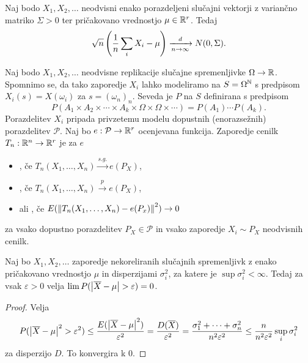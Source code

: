 \begin{izrek}
  Naj bodo $X_1, X_2, \ldots$ neodvisni enako porazdeljeni slučajni vektorji z
  variančno matriko $\Sigma > 0$ ter pričakovano vrednostjo $\mu \in \mathbb{R}^r$.
  Tedaj
  \[
	\sqrt{n} \left( \frac{1}{n} \sum_i X_i - \mu \right)
	\xrightarrow[n \to \infty]{d}
	N(0, \Sigma).
  \]
\end{izrek}


Naj bodo $X_1, X_2, \ldots$ neodvisne replikacije slučajne spremenljivke $\Omega
\to \mathbb{R}$.
Spomnimo se, da tako zaporedje $X_i$ lahko modeliramo na $S = \Omega^{\mathbb{N}}$ s
predpisom $X_i(s) = X(\omega_i)$ za $s = (\omega_n)_n$.
Seveda je $P$ na $S$ definirana s predpisom
\[
  P(A_1 \times A_2 \times \cdots \times A_k \times \Omega \times \Omega \times
  \cdots)
  = P(A_1) \cdots P(A_k).
\]
Porazdelitev $X_i$ pripada privzetemu modelu dopustnih (enorazsežnih)
porazdelitev $\mathcal{P}$.
Naj bo $e: \mathcal{P} \to \mathbb{R}^r$ ocenjevana funkcija.
Zaporedje cenilk $T_n: \mathbb{R}^n \to \mathbb{R}^r$ je za $e$
\begin{itemize}
\item {}, če $T_n(X_1, \ldots, X_n) \xrightarrow{s.g.}
  e(P_X)$,
\item {}, če $T_n(X_1, \ldots, X_n) \xrightarrow{p} e(P_X)$,
\item {} ali , če $E(\left\lVert T_n(X_1,
	\ldots, X_n) - e(P_x)\right\rVert^2) \to 0$
\end{itemize}
za vsako dopustno porazdelitev $P_X \in \mathcal{P}$ in vsako zaporedje $X_i
\sim P_X$ neodvisnih cenilk.

\begin{izrek}
  Naj bo $X_1, X_2, \ldots$ zaporedje nekoreliranih slučajnih spremenljivk z
  enako pričakovano vrednostjo $\mu$ in disperzijami $\sigma_i^2$, za katere je
  $\sup \sigma_i^2 < \infty$.
  Tedaj za vsak $\varepsilon > 0$ velja $\lim P(\left| \overline{X} - \mu \right| >
  \varepsilon) = 0$.
\end{izrek}

\begin{proof}
  Velja
  \[
	P(\left| \overline{X} - \mu \right|^2 > \varepsilon^2) \le \frac{E(\left| \overline{X} -
		\mu \right|^2)}{\varepsilon^2}
	= \frac{D(\overline{X})}{\varepsilon^2}
	= \frac{\sigma_1^2 + \cdots + \sigma_n^2}{n^2 \varepsilon^2}
	\le \frac{n}{n^2 \varepsilon^2} \sup_i \sigma_i^2
  \]
  za disperzijo $D$.
  To konvergira k $0$.
\end{proof}


